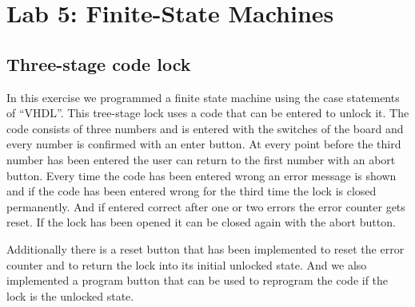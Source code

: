 \chapter{Lab 5: Finite-State Machines} \label{day5}

\section{Three-stage code lock}

In this exercise we programmed a finite state machine using the case statements of ``VHDL''. This tree-stage lock uses a code that can be entered to unlock it. The code consists of three numbers and is entered with the switches of the board and every number is confirmed with an enter button. At every point before the third number has been entered the user can return to the first number with an abort button. Every time the code has been entered wrong an error message is shown and if the code has been entered wrong for the third time the lock is closed permanently. And if entered correct after one or two errors the error counter gets reset. If the lock has been opened it can be closed again with the abort button.

Additionally there is a reset button that has been implemented to reset the error counter and to return the lock into its initial unlocked state. And we also implemented a program button that can be used to reprogram the code if the lock is the unlocked state.


